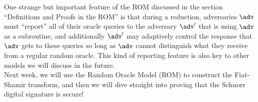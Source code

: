 \documentclass[12pt]{article}
\newtheorem{reading}{Reading}
\theoremstyle{definition}
\theoremstyle{remark}
\theoremstyle{definition}
\begin{document}
One strange but important feature of the ROM discussed in the section ``Definitions and Proofs in the ROM'' is that during a reduction, adversaries $\adv$ must ``report'' all of their oracle queries to the adversary $\adv'$ that is using $\adv$ as a subroutine, and additionally $\adv'$ may adaptively control the response that $\adv$ gets to these queries so long as $\adv$ cannot distinguish what they receive from a regular random oracle. This kind of reporting feature is also key to other models we will discuss in the future.\\

Next week, we will use the Random Oracle Model (ROM) to construct the Fiat-Shamir transform, and then we will dive straight into proving that the Schnorr digital signature is secure!




\end{document}
